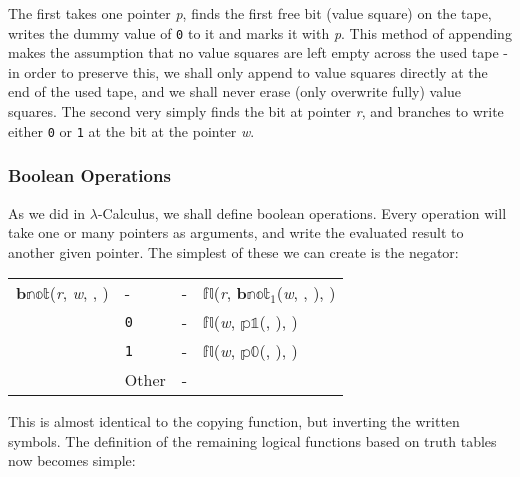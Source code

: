 \documentclass[Master.tex]{subfiles}
\begin{document}
\medskip

The first takes one pointer \textit{p}, finds the first free bit (value square) on the tape, writes the dummy value of \texttt{0} to it and marks it with \textit{p}. This method of appending makes the assumption that no value squares are left empty across the used tape - in order to preserve this, we shall only append to value squares directly at the end of the used tape, and we shall never erase (only overwrite fully) value squares. The second very simply finds the bit at pointer \textit{r}, and branches to write either \texttt{0} or \texttt{1} at the bit at the pointer \textit{w}.

\subsubsection{Boolean Operations}

As we did in $\lambda$-Calculus, we shall define boolean operations. Every operation will take one or many pointers as arguments, and write the evaluated result to another given pointer. The simplest of these we can create is the negator:

\medskip\noindent\begin{tabu} to \textwidth{XXXX}
    $\mathbb{\mathbf{b}not}$(\textit{r}, \textit{w}, , )   & - & - & $\mathbb{fl}$(\textit{r}, $\mathbb{\mathbf{b}not}_1$(\textit{w}, , ), ) \\
    \hhline{----}
     & \texttt{0} & - & $\mathbb{fl}$(\textit{w}, $\mathbb{p1}$(, ), ) \\
                                                                                       & \texttt{1} & - & $\mathbb{fl}$(\textit{w}, $\mathbb{p0}$(, ), ) \\ 
                                                                                       & Other & - &  \\
\end{tabu}

\medskip
This is almost identical to the copying function, but inverting the written symbols. The definition of the remaining logical functions based on truth tables now becomes simple:
\end{document}
